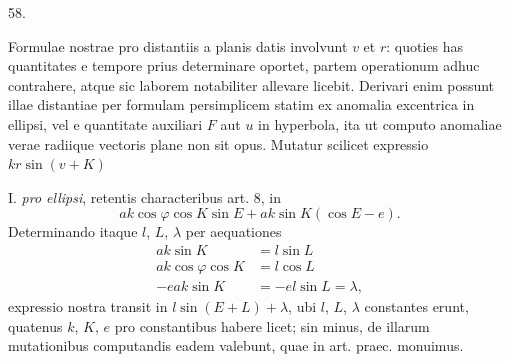 \par\medskip
\hypertarget{native-076-article058}{}
\begin{center}58.\end{center}
Formulae nostrae pro distantiis a planis datis involvunt $v$ et $r$: quoties has quantitates e tempore prius determinare oportet, partem operationum adhuc contrahere, atque sic laborem notabiliter allevare licebit. Derivari enim possunt illae distantiae per formulam persimplicem statim ex anomalia excentrica in ellipsi, vel e quantitate auxiliari $F$ aut $u$ in hyperbola, ita ut computo anomaliae verae radiique vectoris plane non sit opus. Mutatur scilicet expressio $kr\sin(v+K)$

I. \textit{pro ellipsi}, retentis characteribus art. 8, in
\[
ak\cos\varphi\cos K\sin E+ak\sin K(\cos E-e).
\]
Determinando itaque $l$, $L$, $\lambda$ per aequationes
\[
\begin{aligned}
ak\sin K&=l\sin L\\
ak\cos\varphi\cos K&=l\cos L\\
-eak\sin K&=-el\sin L=\lambda,
\end{aligned}
\]
expressio nostra transit in $l\sin(E+L)+\lambda$, ubi $l$, $L$, $\lambda$ constantes erunt, quatenus $k$, $K$, $e$ pro constantibus habere licet; sin minus, de illarum mutationibus computandis eadem valebunt, quae in art. praec. monuimus.

